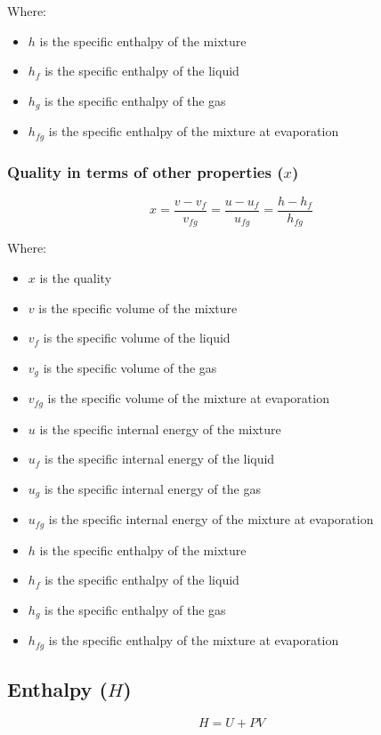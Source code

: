 \documentclass[11pt]{article}
\begin{document}
Where:
\begin{itemize}
\item \(h\) is the specific enthalpy of the mixture
\item \(h_f\) is the specific enthalpy of the liquid
\item \(h_g\) is the specific enthalpy of the gas
\item \(h_{fg}\) is the specific enthalpy of the mixture at evaporation
\end{itemize}

\newpage

\subsubsection{Quality in terms of other properties (\(x\))}
\label{sec:org455c84e}
\[x = \frac{v - v_f}{v_{fg}} = \frac{u - u_f}{u_{fg}} = \frac{h - h_f}{h_{fg}}\]

Where:
\begin{itemize}
\item \(x\) is the quality
\item \(v\) is the specific volume of the mixture
\item \(v_f\) is the specific volume of the liquid
\item \(v_g\) is the specific volume of the gas
\item \(v_{fg}\) is the specific volume of the mixture at evaporation
\item \(u\) is the specific internal energy of the mixture
\item \(u_f\) is the specific internal energy of the liquid
\item \(u_g\) is the specific internal energy of the gas
\item \(u_{fg}\) is the specific internal energy of the mixture at evaporation
\item \(h\) is the specific enthalpy of the mixture
\item \(h_f\) is the specific enthalpy of the liquid
\item \(h_g\) is the specific enthalpy of the gas
\item \(h_{fg}\) is the specific enthalpy of the mixture at evaporation
\end{itemize}

\newpage

\subsection{Enthalpy (\(H\))}
\label{sec:org66b4258}
\[H = U + PV\]
\end{document}
